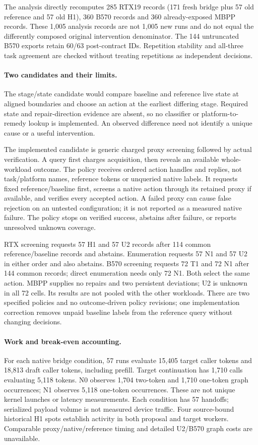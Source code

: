 The analysis directly recomputes 285 RTX19 records (171 fresh bridge plus 57 old reference and 57 old H1), 360 B570 records and 360 already-exposed MBPP records. These 1,005 analysis records are not 1,005 new runs and do not equal the differently composed original intervention denominator. The 144 untruncated B570 exports retain 60/63 post-contract IDs. Repetition stability and all-three task agreement are checked without treating repetitions as independent decisions.

\paragraph{Two candidates and their limits.}
The stage/state candidate would compare baseline and reference live state at aligned boundaries and choose an action at the earliest differing stage. Required state and repair-direction evidence are absent, so no classifier or platform-to-remedy lookup is implemented. An observed difference need not identify a unique cause or a useful intervention.

The implemented candidate is generic charged proxy screening followed by actual verification. A query first charges acquisition, then reveals an available whole-workload outcome. The policy receives ordered action handles and replies, not task/platform names, reference tokens or unqueried native labels. It requests fixed reference/baseline first, screens a native action through its retained proxy if available, and verifies every accepted action. A failed proxy can cause false rejection on an untested configuration; it is not reported as a measured native failure. The policy stops on verified success, abstains after failure, or reports unresolved unknown coverage.

RTX screening requests 57 H1 and 57 U2 records after 114 common reference/baseline records and abstains. Enumeration requests 57 N1 and 57 U2 in either order and also abstains. B570 screening requests 72 T1 and 72 N1 after 144 common records; direct enumeration needs only 72 N1. Both select the same action. MBPP supplies no repairs and two persistent deviations; U2 is unknown in all 72 cells. Its results are not pooled with the other workloads. There are two specified policies and no outcome-driven policy revisions; one implementation correction removes unpaid baseline labels from the reference query without changing decisions.

\paragraph{Work and break-even accounting.}
For each native bridge condition, 57 runs evaluate 15,405 target caller tokens and 18,813 draft caller tokens, including prefill. Target continuation has 1,710 calls evaluating 5,118 tokens. N0 observes 1,704 two-token and 1,710 one-token graph occurrences; N1 observes 5,118 one-token occurrences. These are not unique kernel launches or latency measurements. Each condition has 57 handoffs; serialized payload volume is not measured device traffic. Four source-bound historical H1 spots establish activity in both proposal and target workers. Comparable proxy/native/reference timing and detailed U2/B570 graph costs are unavailable.

